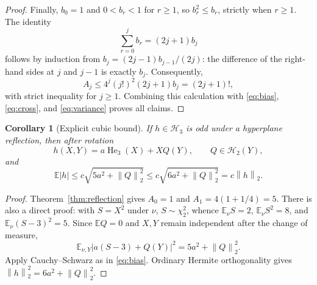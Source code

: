 \documentclass[11pt]{article}
\newtheorem{corollary}{Corollary}
\newcommand{\E}{\mathbb E}
\newcommand{\Hh}{\mathcal H}
\newcommand{\He}{\operatorname{He}}
\newcommand{\norm}[1]{\left\lVert #1\right\rVert}
\begin{document}
\begin{proof}
Finally, $b_0=1$ and $0<b_r<1$ for $r\geq1$, so $b_r^2\leq b_r$,
strictly when $r\geq1$.  The identity
\begin{equation}\label{eq:sum}
 \sum_{r=0}^j b_r=(2j+1)b_j
\end{equation}
follows by induction from $b_j=(2j-1)b_{j-1}/(2j)$: the difference of the
right-hand sides at $j$ and $j-1$ is exactly $b_j$.
Consequently,
\[
 A_j\leq4^j(j!)^2(2j+1)b_j=(2j+1)!,
\]
with strict inequality for $j\geq1$.  Combining this calculation with
\eqref{eq:bias}, \eqref{eq:cross}, and \eqref{eq:variance} proves all claims.
\end{proof}

\begin{corollary}[Explicit cubic bound]\label{cor:cubic}
If $h\in\Hh_3$ is odd under a hyperplane reflection, then after rotation
\[
 h(X,Y)=a\He_3(X)+XQ(Y),\qquad Q\in\Hh_2(Y),
\]
and
\begin{equation}\label{eq:cubic}
 \E|h|\leq c\sqrt{5a^2+\norm{Q}_2^2}
 \leq c\sqrt{6a^2+\norm{Q}_2^2}=c\norm{h}_2.
\end{equation}
\end{corollary}

\begin{proof}
Theorem~\ref{thm:reflection} gives $A_0=1$ and
$A_1=4(1+1/4)=5$.  There is also a direct proof: with $S=X^2$ under
$\nu$, $S\sim\chi^2_2$, whence $\E_\nu S=2$, $\E_\nu S^2=8$, and
$\E_\nu(S-3)^2=5$.  Since $\E Q=0$ and $X,Y$ remain independent after the
change of measure,
\[
 \E_{\nu,Y}|a(S-3)+Q(Y)|^2=5a^2+\norm{Q}_2^2.
\]
Apply Cauchy--Schwarz as in \eqref{eq:bias}.  Ordinary Hermite orthogonality
gives $\norm{h}_2^2=6a^2+\norm{Q}_2^2$.
\end{proof}
\end{document}
